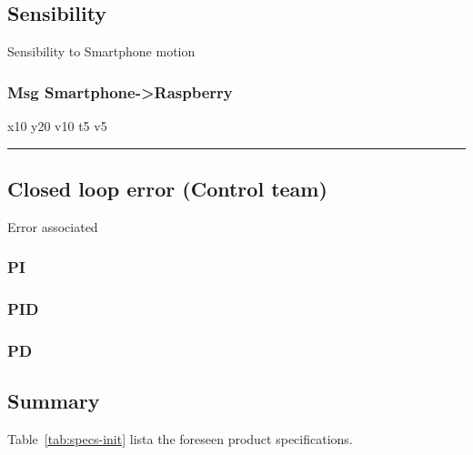 \subsection{Sensibility}%
\label{sec:org622e63a}
Sensibility to Smartphone motion
\subsubsection{Msg Smartphone->Raspberry}%
\label{sec:org6b5cb97}
x10 y20 v10
t5 v5

\noindent\rule{\textwidth}{0.5pt}
\subsection{Closed loop error (Control team)}%
\label{sec:org436f732}
Error associated
\subsubsection{PI}%
\label{sec:org9859444}%
\subsubsection{PID}%
\label{sec:org352c4d4}
\subsubsection{PD}%
\label{sec:org0d324c4}

\subsection{Summary}%
\label{sec:org1f95256}
Table~\ref{tab:specs-init} lista the foreseen product specifications.

